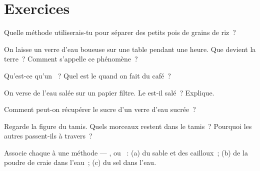 \section{Exercices}

\begin{exercise}[$\star$]\label{exo:g3:separating-mixtures:1}
Quelle méthode utiliserais-tu pour séparer des petits pois de grains de
riz~?
\end{exercise}

\begin{exercise}[$\star$]\label{exo:g3:separating-mixtures:2}
On laisse un verre d'eau boueuse sur une table pendant une heure. Que
devient la terre~? Comment s'appelle ce phénomène~?
\end{exercise}

\begin{exercise}[$\star$]\label{exo:g3:separating-mixtures:3}
Qu'est-ce qu'un ~? Quel est le  quand on fait du café~?
\end{exercise}

\begin{exercise}[$\star$]\label{exo:g3:separating-mixtures:4}
On verse de l'eau salée sur un papier filtre. Le  est-il salé~?
Explique.
\end{exercise}

\begin{exercise}[$\star$]\label{exo:g3:separating-mixtures:5}
Comment peut-on récupérer le sucre d'un verre d'eau sucrée~?
\end{exercise}

\begin{exercise}[$\star$]\label{exo:g3:separating-mixtures:6}
Regarde la figure du tamis. Quels morceaux restent dans le tamis~?
Pourquoi les autres passent-ils à travers~?
\end{exercise}

\begin{exercise}[$\star$]\label{exo:g3:separating-mixtures:7}
Associe chaque  à une méthode --- ,  ou
~: (a) du sable et des cailloux~; (b) de la poudre de craie
dans l'eau~; (c) du sel dans l'eau.
\end{exercise}

